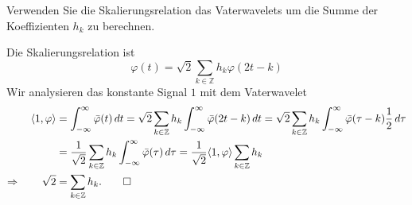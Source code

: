 Verwenden Sie die Skalierungsrelation das Vaterwavelets um die
Summe der Koeffizienten $h_k$ zu berechnen.

\begin{loesung}
Die Skalierungsrelation ist
\[
\varphi(t) = \sqrt{2} \sum_{k\in\mathbb Z} h_k \varphi(2t-k)
\]
Wir analysieren das konstante Signal $1$ mit dem Vaterwavelet
\begin{align*}
\langle 1,\varphi\rangle
&=
\int_{-\infty}^\infty
\bar{\varphi}(t)\,dt
=
\sqrt{2}
\sum_{k\in\mathbb Z} 
h_k
\int_{-\infty}^\infty
\bar{\varphi}(2t-k)
\,dt
=
\sqrt{2}
\sum_{k\in\mathbb Z} 
h_k
\int_{-\infty}^\infty
\bar{\varphi}(\tau-k)
\frac12
\,d\tau
\\
&=
\frac{1}{\sqrt{2}}
\sum_{k\in\mathbb Z} 
h_k
\int_{-\infty}^\infty
\bar{\varphi}(\tau)
\,d\tau
=
\frac{1}{\sqrt{2}}
\langle 1,\varphi\rangle
\sum_{k\in\mathbb Z} h_k
\\
\Rightarrow\qquad
\sqrt{2}
&=
\sum_{k\in\mathbb Z} h_k.
\qedhere
\end{align*}
\end{loesung}


